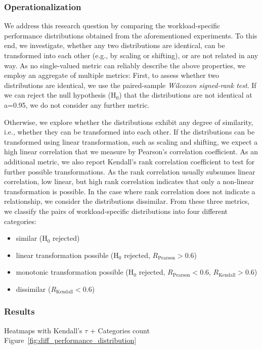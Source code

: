 
\subsubsection{Operationalization}
We address this research question by comparing the workload-specific performance distributions obtained from the aforementioned experiments. To this end, we investigate, whether any two distributions are identical, can be transformed into each other (e.g., by scaling or shifting), or are not related in any way. As no single-valued metric can reliably describe the above properties, we employ an aggregate of multiple metrics: First, to assess whether two distributions are identical, we use the paired-sample \emph{Wilcoxon signed-rank test}. If we can reject the null hypothesis ($\text{H}_0$) that the distributions are not identical at a=0.95, we do not consider any further metric. 

Otherwise, we explore whether the distributions exhibit any degree of similarity, i.e., whether they can be transformed into each other. If the distributions can be transformed using linear transformation, such as scaling and shifting, we expect a high linear correlation that we measure by Pearson’s correlation coefficient. As an additional metric, we also report Kendall’s rank correlation coefficient to test for further possible transformations. As the rank correlation usually subsumes linear correlation, low linear, but high rank correlation indicates that only a non-linear transformation is possible. In the case where rank correlation does not indicate a relationship, we consider the distributions dissimilar. From these three metrics, we classify the pairs of workload-specific distributions into four different categories:

\begin{itemize}
	\item similar ($\text{H}_0$ rejected)
	\item linear transformation possible ($\text{H}_0$ rejected, $R_\text{Pearson} > 0.6$)
	\item monotonic transformation possible ($\text{H}_0$ rejected, $R_\text{Pearson} < 0.6$, $R_\text{Kendall} > 0.6$)
	\item dissimilar ($R_\text{Kendall} < 0.6$)
\end{itemize}

\subsubsection{Results} {\color{red} Heatmaps with Kendall's $\tau$ + Categories count} Figure~\ref{fig:diff_performance_distribution}

